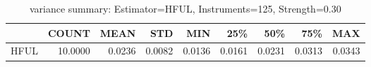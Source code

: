 \begin{table}[ht]
\centering
\caption{variance summary: Estimator=HFUL, Instruments=125, Strength=0.30}
\begin{tabular}{lrrrrrrrr}
\toprule
 & COUNT & MEAN & STD & MIN & 25\% & 50\% & 75\% & MAX \\
\midrule
HFUL & 10.0000 & 0.0236 & 0.0082 & 0.0136 & 0.0161 & 0.0231 & 0.0313 & 0.0343 \\
\bottomrule
\end{tabular}
\end{table}
